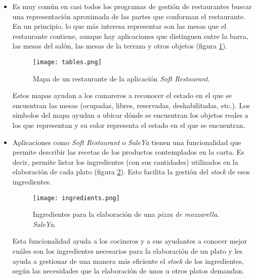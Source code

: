     \begin{itemize}
    \item Es muy común en casi todos los programas de gestión de restaurantes
    buscar una representación aproximada de las partes que conforman el
    restaurante. En un principio, lo que más interesa representar son las mesas
    que el restaurante contiene, aunque hay aplicaciones que distinguen entre
    la barra, las mesas del salón, las mesas de la terraza y otros objetos
    (figura \ref{fig:tables}).

    \begin{figure}[!h]
      \begin{center}
        \texttt{[image: tables.png]}
        \caption{Mapa de un restaurante de la aplicación
        \emph{Soft Restaurant}\cite{bib:softRestaurant}.}
        \label{fig:tables}
      \end{center}
    \end{figure}

    Estos mapas ayudan a los camareros a reconocer el estado en el que se
    encuentran las mesas (ocupadas, libres, reservadas, deshabilitadas, etc.).
    Los símbolos del mapa ayudan a ubicar dónde se encuentran los objetos
    reales a los que representan y su color representa el estado en el que
    se encuentran.

    \item Aplicaciones como \emph{Soft Restaurant}\cite{bib:softRestaurant} o 
    \emph{SaleYa}\cite{bib:saleYa} tienen una funcionalidad que permite 
    describir las recetas de los productos contemplados en la carta. Es decir, 
    permite listar los ingredientes (con sus cantidades) utilizados en la 
    elaboración de cada plato (figura \ref{fig:ingredients}). Esto facilita la
    gestión del \emph{stock} de esos ingredientes.

    \begin{figure}[!h]
      \begin{center}
        \texttt{[image: ingredients.png]}
        \caption{Ingredientes para la elaboración de una \emph{pizza de 
        mozzarella}. \emph{SaleYa}\cite{bib:saleYa}.}
        \label{fig:ingredients}
      \end{center}
    \end{figure}

    Esta funcionalidad ayuda a los cocineros y a sus ayudantes a conocer
    mejor cuáles son los ingredientes necesarios para la elaboración de 
    un plato y les ayuda a gestionar de una manera más eficiente el
    \emph{stock} de los ingredientes, según las necesidades que la 
    elaboración de unos u otros platos demandan.


\end{itemize}
